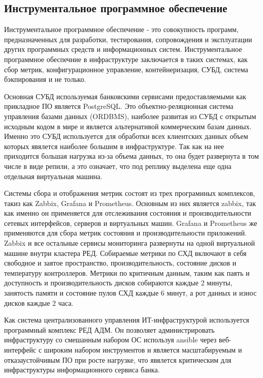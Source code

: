 \documentclass[14pt, a4paper]{extarticle}
\begin{document}
\subsection{Инструментальное программное обеспечение}

Инструментальное программное обеспечение - это совокупность программ, предназначенных для
разработки, тестирования, сопровождения и эксплуатации других программных средств и
информационных систем. Инструментальное программное обеспечние в инфраструктуре заключается
в таких системах, как сбор метрик, конфигурационное управление, контейнеризация,
СУБД, система бэкпирования и не только.

Основная СУБД используемая банковскими сервисами предоставляемыми как прикладное ПО
является PostgreSQL. Это объектно-реляционная система управления базами данных (ORDBMS),
наиболее развитая из СУБД с открытым исходным кодом в мире и является альтернативой
коммерческим базам данных. Именно это СУБД используется для обработки всех клиентских
данных объем которых явялется наиболее большим в инфраструктуре. Так как на нее приходится
большая нагрузка из-за объема данных, то она будет развернута в том числе в виде репили, а
это означает, что под реплику выделена еще одна отдельная виртуальная машина.

Системы сбора и отображения метрик состоят из трех програминых комплексов, такиз как Zabbix,
Grafana и Prometheus. Основным из них является zabbix, так как именно он применяется для
отслеживания состояния и производительности сетевых интерфейсов, серверов и виртуальных машин.
Grafana и Prometheus же применяются для сбора метрик состояния и производительности приложений.
Zabbix и все остальные сервисы мониторинга развернуты на одной виртуальной машине внутри кластера РЕД.
Собираемые метрики по СХД включают в себя свободное и заятое пространство, производительность,
состояние дисков и температуру контроллеров. Метрики по критичным данным, таким как паять и доступность
и производительность дисков собираются каждые 2 минуты, занятость памяти и состояние пулов СХД
каждые 6 минут, а рот данных и износ дисков каждые 2 часа.

Как система централизованного управления ИТ-инфраструктурой используется программный комплекс
РЕД АДМ. Он позволяет администрировать инфраструктуру со смешанным набором ОС используя
ansible через веб-интерфейс с широким набором инструментов и является масштабируемым и
отказаустойчивым ПО при росте нагрузке, что явялется критическим для инфраструктуры информационного
сервиса банка.
\end{document}

